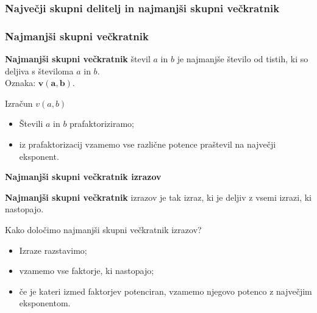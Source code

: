         \begin{frame}
            \frametitle{Največji skupni delitelj in najmanjši skupni večkratnik}
        \end{frame}

        \begin{frame}[t]
            \frametitle{Najmanjši skupni večkratnik}


            \begin{alertblock}{}
                \textbf{Najmanjši skupni večkratnik} števil $a$ in $b$ je najmanjše število od tistih, ki so deljiva s številoma $a$ in $b$. \\ 
                Oznaka: $\mathbf{v(a,b)}$.
            \end{alertblock}

            \pause

            \begin{block}{Izračun $v(a,b)$}
                \begin{itemize}
                    \item Števili $a$ in $b$ prafaktoriziramo;
                    \item iz prafaktorizacij vzamemo vse različne potence praštevil na največji eksponent.
                \end{itemize}
            \end{block}
        \end{frame}

        \begin{frame}[t]
            \Large\textbf{Najmanjši skupni večkratnik izrazov}
            ~\\
            \normalsize

            \pause

            \begin{alertblock}{}
                \textbf{Najmanjši skupni večkratnik} izrazov je tak izraz, ki je deljiv z vsemi izrazi, ki nastopajo. 
            \end{alertblock}

            \pause

            \begin{block}{Kako določimo najmanjši skupni večkratnik izrazov?}
                \begin{itemize}
                    \item Izraze razstavimo;
                    \item vzamemo vse faktorje, ki nastopajo;
                    \item če je kateri izmed faktorjev potenciran, vzamemo njegovo potenco z največjim eksponentom.
                \end{itemize}
            \end{block}
        \end{frame}

